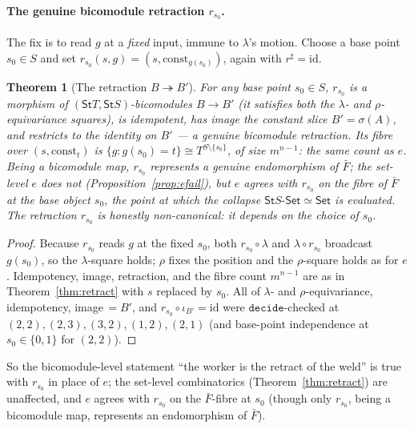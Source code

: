 \documentclass[11pt]{article}
\newcommand{\Set}{\mathsf{Set}}
\newcommand{\St}{\mathsf{St}}                      %
\newcommand{\bk}[1]{{#1}^{\sharp}}                 %
\newcommand{\const}{\mathrm{const}}
\theoremstyle{plain}
\newtheorem{theorem}{Theorem}
\theoremstyle{definition}
\theoremstyle{remark}
\begin{document}
\paragraph{The genuine bicomodule retraction $r_{s_0}$.}
The fix is to read $g$ at a \emph{fixed} input, immune to $\lambda$'s motion. Choose a base
point $s_0\in S$ and set $r_{s_0}(s,g)=(s,\const_{g(s_0)})$, again with $\bk r=\mathrm{id}$.

\begin{theorem}[The retraction $B\twoheadrightarrow B'$]\label{thm:retract-r}
For any base point $s_0\in S$, $r_{s_0}$ is a morphism of $(\St T,\St S)$-bicomodules
$B\to B'$ \textup{(}it satisfies both the $\lambda$- and $\rho$-equivariance squares\textup{)},
is idempotent, has image the constant slice $B'=\sigma(A)$, and restricts to the identity on
$B'$ --- a genuine bicomodule retraction. Its fibre over $(s,\const_t)$ is
$\{g:g(s_0)=t\}\cong T^{S\setminus\{s_0\}}$, of size $m^{n-1}$: the \emph{same count} as $e$.
Being a bicomodule map, $r_{s_0}$ represents a genuine endomorphism of $\bar F$; the set-level
$e$ does not (Proposition~\ref{prop:efail}), but $e$ agrees with $r_{s_0}$ on the fibre of
$\bar F$ at the base object $s_0$, the point at which the collapse $\St S\text{-}\Set\simeq\Set$
is evaluated. The retraction $r_{s_0}$ is honestly \emph{non-canonical}: it depends on the
choice of $s_0$.
\end{theorem}

\begin{proof}
Because $r_{s_0}$ reads $g$ at the fixed $s_0$, both $r_{s_0}\circ\lambda$ and
$\lambda\circ r_{s_0}$ broadcast $g(s_0)$, so the $\lambda$-square holds; $\rho$ fixes the
position and the $\rho$-square holds as for $e$. Idempotency, image, retraction, and the
fibre count $m^{n-1}$ are as in Theorem~\ref{thm:retract} with $s$ replaced by $s_0$. All of
$\lambda$- and $\rho$-equivariance, idempotency, image$\,=\!B'$, and
$r_{s_0}\circ\iota_{B'}=\mathrm{id}$ were $\mathtt{decide}$-checked at
$(2,2),(2,3),(3,2),(1,2),(2,1)$ (and base-point independence at $s_0\in\{0,1\}$ for $(2,2)$).
\end{proof}

\noindent So the bicomodule-level statement ``the worker is the retract of the weld'' is true
with $r_{s_0}$ in place of $e$; the set-level combinatorics (Theorem~\ref{thm:retract}) are
unaffected, and $e$ agrees with $r_{s_0}$ on the $\bar F$-fibre at $s_0$ (though only
$r_{s_0}$, being a bicomodule map, represents an endomorphism of $\bar F$).
\end{document}
